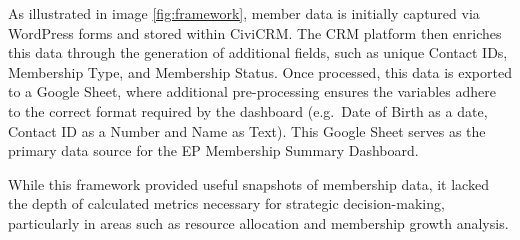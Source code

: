 \documentclass[11pt,a4paper,]{article}
\begin{document}
As illustrated in image \ref{fig:framework}, member data is initially captured via WordPress forms and stored within CiviCRM. The CRM platform then enriches this data through the generation of additional fields, such as unique Contact IDs, Membership Type, and Membership Status. Once processed, this data is exported to a Google Sheet, where additional pre-processing ensures the variables adhere to the correct format required by the dashboard (e.g.~Date of Birth as a date, Contact ID as a Number and Name as Text). This Google Sheet serves as the primary data source for the EP Membership Summary Dashboard.

While this framework provided useful snapshots of membership data, it lacked the depth of calculated metrics necessary for strategic decision-making, particularly in areas such as resource allocation and membership growth analysis.
\end{document}
